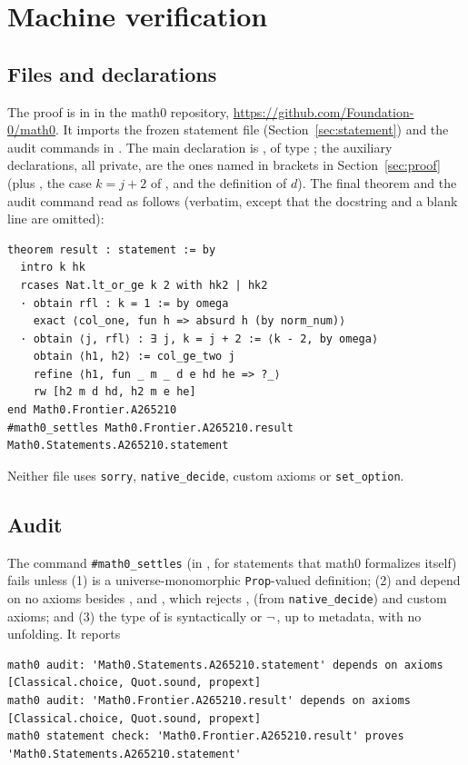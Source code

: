 \documentclass[11pt]{amsart}
\theoremstyle{plain}
\theoremstyle{definition}
\begin{document}
\section{Machine verification}\label{sec:lean}

\subsection*{Files and declarations}
The proof is in  in the math0 repository, \url{https://github.com/Foundation-0/math0}. It imports the frozen statement file  (Section~\ref{sec:statement}) and the audit commands in . The main declaration is , of type ; the auxiliary declarations, all private, are the ones named in brackets in Section~\ref{sec:proof} (plus , the case $k=j+2$ of , and the definition  of $d$). The final theorem and the audit command read as follows (verbatim, except that the docstring and a blank line are omitted):
\begin{lstlisting}
theorem result : statement := by
  intro k hk
  rcases Nat.lt_or_ge k 2 with hk2 | hk2
  · obtain rfl : k = 1 := by omega
    exact ⟨col_one, fun h => absurd h (by norm_num)⟩
  · obtain ⟨j, rfl⟩ : ∃ j, k = j + 2 := ⟨k - 2, by omega⟩
    obtain ⟨h1, h2⟩ := col_ge_two j
    refine ⟨h1, fun _ m _ d e hd he => ?_⟩
    rw [h2 m d hd, h2 m e he]
end Math0.Frontier.A265210
#math0_settles Math0.Frontier.A265210.result Math0.Statements.A265210.statement
\end{lstlisting}
Neither file uses \texttt{sorry}, \texttt{native\_decide}, custom axioms or \texttt{set\_option}.

\subsection*{Audit}
The command \texttt{\#math0\_settles} (in , for statements that math0 formalizes itself) fails unless (1)  is a universe-monomorphic \texttt{Prop}-valued definition; (2)  and  depend on no axioms besides ,  and , which rejects ,  (from \texttt{native\_decide}) and custom axioms; and (3) the type of  is syntactically  or $\neg$\,, up to metadata, with no unfolding. It reports
\begin{lstlisting}[basicstyle=\ttfamily\scriptsize]
math0 audit: 'Math0.Statements.A265210.statement' depends on axioms [Classical.choice, Quot.sound, propext]
math0 audit: 'Math0.Frontier.A265210.result' depends on axioms [Classical.choice, Quot.sound, propext]
math0 statement check: 'Math0.Frontier.A265210.result' proves 'Math0.Statements.A265210.statement'
\end{lstlisting}
\end{document}

